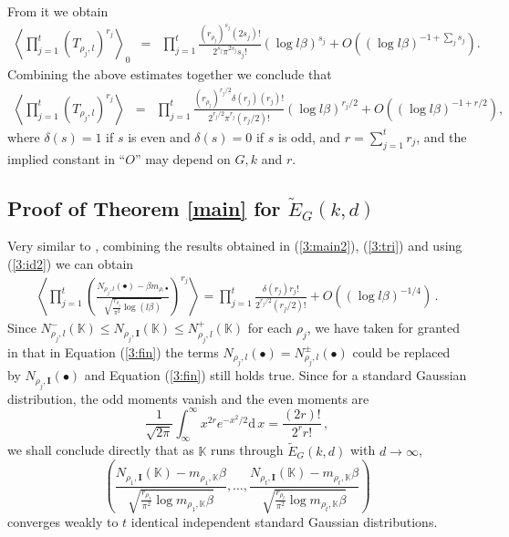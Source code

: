 \documentclass[12pt]{amsart}
\theoremstyle{plain}
\begin{document}
From it we obtain
\begin{eqnarray*}
\left\langle \prod_{j=1}^t \left(T_{\rho_j,l}\right)^{r_j} \right\rangle_0 & = &  \prod_{j=1}^t\frac{ (r_{\rho_j})^{s_j}(2s_j)!}{2^{s_j} \pi^{2s_j} s_j! } \left(\log l \beta\right)^{s_j} + O\left(\left(\log l \beta\right)^{-1+\sum_j s_j}\right).\end{eqnarray*}
Combining the above estimates together we conclude that
\begin{eqnarray} \label{3:main2}
\left\langle \prod_{j=1}^{t} \left(T_{\rho_j,l}\right)^{r_j} \right\rangle & = &  \prod_{j=1}^{t}\frac{ (r_{\rho_j})^{r_j/2}\delta(r_j) (r_j)!}{2^{r_j/2} \pi^{r_j} (r_j/2)! } \left(\log l \beta\right)^{r_j/2} + O\left(\left(\log l \beta\right)^{-1+r/2}\right),\end{eqnarray}
where $\delta(s)=1$ if $s$ is even and $\delta(s)=0$ if $s$ is odd, and $r=\sum_{j=1}^{t} r_j$, and the implied constant in ``$O$'' may depend on $G,k$ and $r$.

\subsection{Proof of Theorem \ref{main} for $\widetilde{E}_G(k,d)$}
Very similar to \cite[Section 5]{xio}, combining the results obtained in (\ref{3:main2}), (\ref{3:tri}) and using (\ref{3:id2}) we can obtain
\begin{eqnarray} \label{3:fin} \left\langle \prod_{j=1}^t \left(\frac{N_{\rho_j,l}(\bullet)-\beta m_{\rho,\bullet}}{\sqrt{ \frac{r_{\rho_j}}{\pi^2}\log (l\beta)}}\right)^{r_j} \right\rangle= \prod_{j=1}^t \frac{\delta(r_j) r_j! }{2^{r_j/2} \left(r_j/2\right)! } +O\left(\left(\log l\beta\right)^{-1/4} \right)\,. \end{eqnarray}
Since $N_{\rho_j,l}^{-}({{\mathbb K}}) \le N_{\rho_j,{{\mathbf I}}}({{\mathbb K}}) \le N_{\rho_j,l}^{+}({{\mathbb K}})$ for each $\rho_j$, we have taken for granted in \cite[Section 5]{xio} that in Equation (\ref{3:fin}) the terms $N_{\rho_j,l}(\bullet)=N_{\rho_j,l}^{\pm}(\bullet)$ could be replaced by $N_{\rho_j,{{\mathbf I}}}(\bullet)$ and Equation (\ref{3:fin}) still holds true. Since for a standard Gaussian distribution, the odd moments vanish and the even moments are
\[\frac{1}{\sqrt{2 \pi}} \int_{\infty}^{\infty} x^{2r}e^{-x^2/2} {\mathrm{d}} \, x = \frac{(2r)!}{2^r r!}\,,\]
we shall conclude directly that as ${{\mathbb K}}$ runs through $\widetilde{E}_G(k,d)$ with $d \to \infty$,
\[ \left(\frac{N_{\rho_1,{{\mathbf I}}}({{\mathbb K}})-m_{\rho_1,{{\mathbb K}}} \beta}{\sqrt{\frac{r_{\rho_1}}{\pi^2} \log m_{\rho_1,{{\mathbb K}}} \beta}}, \ldots, \frac{N_{\rho_t,{{\mathbf I}}}({{\mathbb K}})-m_{\rho_t,{{\mathbb K}}} \beta}{\sqrt{\frac{r_{\rho_t}}{\pi^2} \log m_{\rho_t,{{\mathbb K}}} \beta}} \right)\]
converges weakly to $t$ identical independent standard Gaussian distributions.
\end{document}
